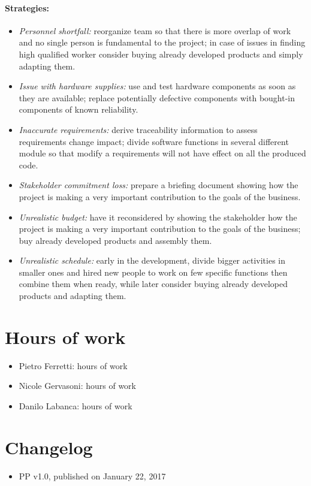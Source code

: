 \documentclass[english]{article}
\begin{document}
\paragraph{Strategies:}
\begin{itemize}

\item \textit{Personnel shortfall:} reorganize team so that there is more overlap of work and no single person is fundamental to the project; in case of issues in finding high qualified worker consider buying already developed products and simply adapting them.

\item \textit{Issue with hardware supplies:} use and test hardware components as soon as they are available; replace potentially defective components with bought-in components of known reliability.

\item \textit{Inaccurate requirements:} derive traceability information to assess requirements change impact; divide software functions in several different module so that modify a requirements will not have effect on all the produced code. 

\item \textit{Stakeholder commitment loss:} prepare a briefing document showing how the project is making a very important contribution to the goals of the business.

\item \textit{Unrealistic budget:} have it reconsidered by showing the stakeholder how the project is making a very important contribution to the goals of the business; buy already developed products and assembly them. 

\item \textit{Unrealistic schedule:} early in the development, divide bigger activities in smaller ones and hired new people to work on few specific functions then combine them when ready, while later consider buying already developed products and adapting them.
\end{itemize}


\appendix
\newpage

\section{Hours of work}

\begin{itemize}
	\item{Pietro Ferretti: hours of work}
	\item{Nicole Gervasoni: hours of work}
	\item{Danilo Labanca: hours of work}
\end{itemize}

\section{Changelog}

\begin{itemize}
	\item PP v1.0, published on January 22, 2017
\end{itemize}
\end{document}
